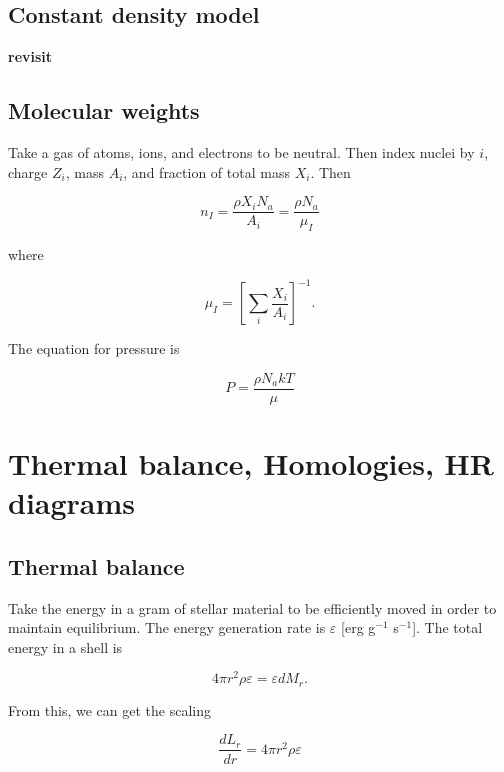 \documentclass{article}
\begin{document}
\subsection{Constant density model}

\textbf{revisit}

\subsection{Molecular weights}

Take a gas of atoms, ions, and electrons to be neutral. Then index nuclei by $i$, charge $Z_i$, mass $A_i$, and fraction of total mass $X_i$. Then 

\begin{equation}
    n_I = \frac{\rho X_i N_a}{A_i} = \frac{\rho N_a}{\mu_I}
\end{equation}

where 

\begin{equation}
    \mu_I = \left[\sum_i \frac{X_i}{A_i}\right]^{-1}.
\end{equation}

The equation for pressure is

\begin{equation}
    P = \frac{\rho N_a kT}{\mu}
\end{equation}

\section{Thermal balance, Homologies, HR diagrams}

\subsection{Thermal balance}

Take the energy in a gram of stellar material to be efficiently moved in order to maintain equilibrium. The energy generation rate is $\varepsilon$ [erg g$^{-1}$ s$^{-1}$]. The total energy in a shell is 

\begin{equation}
    4\pi r^2 \rho \varepsilon = \varepsilon dM_r.
\end{equation}

From this, we can get the scaling 

\begin{equation}
    \boxed{\frac{dL_r}{dr} = 4\pi r^2 \rho \varepsilon}
\end{equation}
\end{document}
